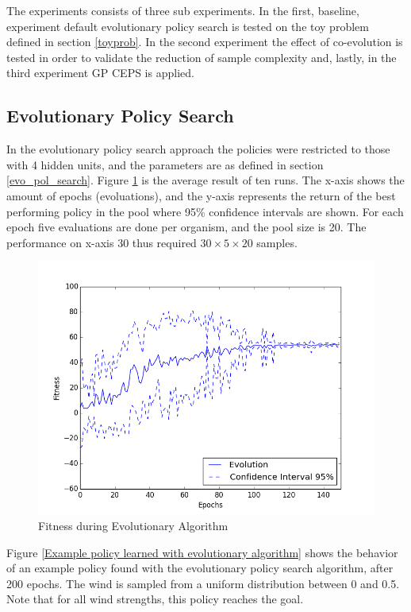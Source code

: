 The experiments consists of three sub experiments. In the first, baseline, experiment default evolutionary policy search is tested on the toy problem defined in section \ref{toyprob}. In the second experiment the effect of co-evolution is tested in order to validate the reduction of sample complexity and, lastly, in the third experiment GP CEPS is applied.

\subsection{Evolutionary Policy Search}

In the evolutionary policy search approach the policies were restricted to those with 4 hidden units, and the parameters are as defined in section \ref{evo_pol_search}. Figure \ref{Fitness during Evolutionary Algorithm} is the average result of ten runs. The x-axis shows the amount of epochs (evoluations), and the y-axis represents the return of the best performing policy in the pool where 95\% confidence intervals are shown. For each epoch five evaluations are done per organism, and the pool size is 20. The performance on x-axis $30$ thus required $30 \times 5 \times 20$ samples. %

\begin{figure}[ht]
  \centering
  \includegraphics[scale=0.5]{images/evo.png}
  \caption{Fitness during Evolutionary Algorithm}\label{Fitness during Evolutionary Algorithm}
\end{figure}

Figure \ref{Example policy learned with evolutionary algorithm} shows the behavior of an example policy found with the evolutionary policy search algorithm, after 200 epochs. The wind is sampled from a uniform distribution between 0 and 0.5. Note that for all wind strengths, this policy reaches the goal. 


